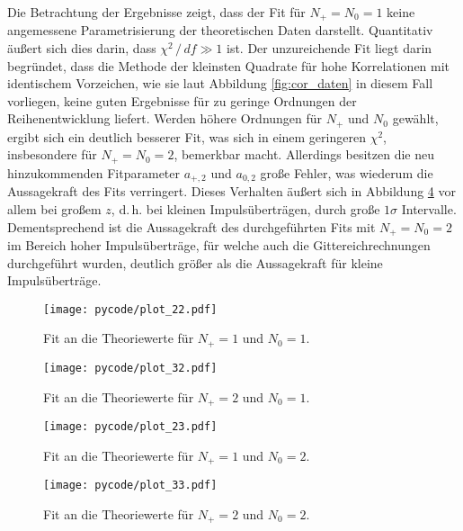 Die Betrachtung der Ergebnisse zeigt, dass der Fit für $N_+ = N_0 = \num{1}$ keine angemessene Parametrisierung der theoretischen Daten darstellt.
Quantitativ äußert sich dies darin, dass $\chi^2 \,/\, df \gg \num{1}$ ist.
Der unzureichende Fit liegt darin begründet, dass die Methode der kleinsten Quadrate für hohe Korrelationen mit identischem Vorzeichen, wie sie laut Abbildung \ref{fig:cor_daten} in diesem Fall vorliegen, keine guten Ergebnisse für zu geringe Ordnungen der Reihenentwicklung liefert.
Werden höhere Ordnungen für $N_+$ und $N_0$ gewählt, ergibt sich ein deutlich besserer Fit, was sich in einem geringeren $\chi^2$, insbesondere für $N_+=N_0=\num{2}$, bemerkbar macht.
Allerdings besitzen die neu hinzukommenden Fitparameter $a_{+,2}$ und $a_{0,2}$ große Fehler, was wiederum die Aussagekraft des Fits verringert.
Dieses Verhalten äußert sich in Abbildung \ref{fig:fit33} vor allem bei großem $z$, d.\,h. bei kleinen Impulsüberträgen, durch große $\num{1}\sigma$ Intervalle.
Dementsprechend ist die Aussagekraft des durchgeführten Fits mit $N_+=N_0=\num{2}$ im Bereich hoher Impulsüberträge, für welche auch die Gittereichrechnungen durchgeführt wurden, deutlich größer als die Aussagekraft für kleine Impulsüberträge.

\begin{figure}
  \centering
  \texttt{[image: pycode/plot\_22.pdf]}
  \caption{Fit an die Theoriewerte für $N_+ = \num{1}$ und $N_0 = \num{1}$.}
  \label{fig:fit22}
\end{figure}
\begin{figure}
  \centering
  \texttt{[image: pycode/plot\_32.pdf]}
  \caption{Fit an die Theoriewerte für $N_+ = \num{2}$ und $N_0 = \num{1}$.}
  \label{fig:fit32}
\end{figure}
\begin{figure}
  \centering
  \texttt{[image: pycode/plot\_23.pdf]}
  \caption{Fit an die Theoriewerte für $N_+ = \num{1}$ und $N_0 = \num{2}$.}
  \label{fig:fit23}
\end{figure}
\begin{figure}
  \centering
  \texttt{[image: pycode/plot\_33.pdf]}
  \caption{Fit an die Theoriewerte für $N_+ = \num{2}$ und $N_0 = \num{2}$.}
  \label{fig:fit33}
\end{figure}

